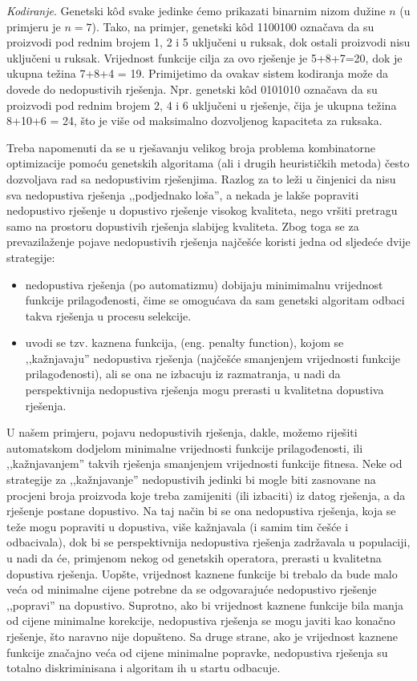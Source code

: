 \documentclass[a4paper, utf8, 11pt, colorlinks]{book}
\theoremstyle{definition}
\begin{document}
\emph{Kodiranje}. Genetski k\^od svake jedinke ćemo prikazati binarnim nizom dužine $n$ (u primjeru je $n=7$). Tako, na primjer, genetski k\^od 1100100 označava da su proizvodi pod rednim brojem 1, 2 i 5 uključeni u ruksak, dok ostali proizvodi nisu uključeni u ruksak. Vrijednost funkcije cilja za ovo rješenje je 5+8+7=20, dok je ukupna težina 7+8+4 = 19. 
Primijetimo da ovakav sistem kodiranja može da dovede do nedopustivih rješenja. Npr. genetski k\^od 0101010 označava da su proizvodi pod rednim brojem 2, 4 i 6 uključeni u rješenje, čija je ukupna težina 8+10+6 = 24, što je više od maksimalno dozvoljenog kapaciteta za ruksaka.

Treba napomenuti da se u rješavanju velikog broja problema kombinatorne optimizacije pomoću genetskih algoritama (ali i drugih heurističkih metoda) često dozvoljava rad sa nedopustivim rješenjima. Razlog za to leži u činjenici da nisu sva nedopustiva rješenja ,,podjednako loša'', a nekada je lakše popraviti nedopustivo rješenje u dopustivo rješenje visokog kvaliteta, nego vršiti pretragu samo na prostoru dopustivih rješenja slabijeg kvaliteta.  Zbog toga se za prevazilaženje pojave nedopustivih rješenja najčešće koristi jedna od sljedeće dvije strategije: 
\begin{itemize}
	\item
	nedopustiva rješenja (po automatizmu) dobijaju minimimalnu vrijednost funkcije prilagođenosti, čime se omogućava da sam genetski algoritam odbaci takva rješenja u procesu selekcije. 
	
	\item uvodi se tzv. kaznena funkcija, (eng. penalty function), kojom se ,,kažnjavaju'' nedopustiva rješenja (najčešće smanjenjem vrijednosti funkcije prilagođenosti), ali se ona ne izbacuju iz razmatranja, u nadi da perspektivnija nedopustiva rješenja mogu prerasti u kvalitetna dopustiva rješenja.
\end{itemize}

U našem primjeru, pojavu nedopustivih rješenja, dakle, možemo riješiti automatskom dodjelom minimalne vrijednosti funkcije prilagođenosti, ili ,,kažnjavanjem'' takvih rješenja smanjenjem vrijednosti funkcije fitnesa. Neke od strategije za ,,kažnjavanje'' nedopustivih jedinki bi mogle biti zasnovane na procjeni broja proizvoda koje treba zamijeniti (ili izbaciti) iz datog rješenja, a da rješenje postane dopustivo. Na taj način bi se ona nedopustiva rješenja, koja se teže mogu popraviti u dopustiva, više kažnjavala (i samim tim češće i odbacivala), dok bi se perspektivnija nedopustiva rješenja zadržavala u populaciji, u nadi da će, primjenom nekog od genetskih operatora, prerasti u kvalitetna dopustiva rješenja. Uopšte, vrijednost kaznene funkcije bi trebalo da bude malo veća od minimalne cijene potrebne da se odgovarajuće nedopustivo rješenje ,,popravi'' na dopustivo. Suprotno, ako bi vrijednost kaznene funkcije bila manja od cijene minimalne korekcije, nedopustiva rješenja se mogu javiti kao konačno rješenje, što naravno nije dopušteno. Sa druge strane, ako je vrijednost kaznene funkcije značajno veća od cijene minimalne popravke, nedopustiva rješenja su totalno diskriminisana i algoritam ih u startu odbacuje. 
\end{document}
